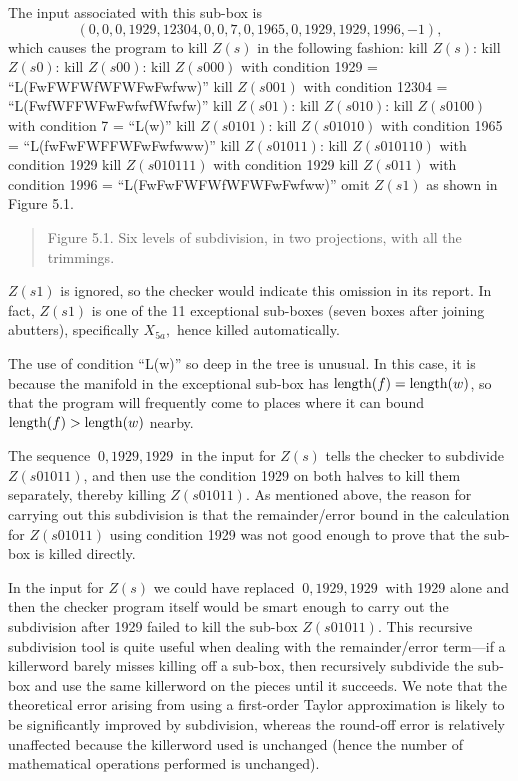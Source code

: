 The input associated with this sub-box is
$$(0, 0, 0, 1929, 12304, 0, 0, 7, 0, 1965, 0, 1929, 1929, 1996, -1),$$
which causes the program to kill $Z(s)$ in the following fashion:
{\noindent\obeylines
\def\>{\hskip 0.05in}
 kill $Z(s)$:
\>kill $Z(s0)$:
\>\>kill $Z(s00)$:
\>\>\>kill $Z(s000)$ with condition 1929 = ``L(FwFWFWfWFWFwFwfww)''
\>\>\>kill $Z(s001)$ with condition 12304 = ``L(FwfWFFWFwFwfwfWfwfw)''
\>\>kill $Z(s01)$:
\>\>\>kill $Z(s010)$:
\>\>\>\>kill $Z(s0100)$ with condition 7 = ``L(w)''
\>\>\>\>kill $Z(s0101)$:
\>\>\>\>\>kill $Z(s01010)$ with condition 1965 = ``L(fwFwFWFFWFwFwfwww)''
\>\>\>\>\>kill $Z(s01011)$:
\>\>\>\>\>\>kill $Z(s010110)$ with condition 1929
\>\>\>\>\>\>kill $Z(s010111)$ with condition 1929
\>\>\>kill $Z(s011)$ with condition 1996 = ``L(FwFwFWFWfWFWFwFwfww)''
\>omit $Z(s1)$
\noindent as shown in Figure 5.1.
}

 
 \centerline{}

 \begin{quote}{Figure 5.1.  Six levels of subdivision, in two projections,
 with all the trimmings.}
 \end{quote}

$Z(s1)$ is ignored, so the checker would indicate this omission
in its report.  In fact, $Z(s1)$ is one of the 11 exceptional sub-boxes (seven boxes after joining abutters), specifically
$X_{5a},$ hence killed automatically.

The use of condition ``L(w)'' so deep in the tree is unusual.
In this case, it is because the manifold in the exceptional sub-box
has ${\rm length}(f) = {\rm length}(w)$, so that the program will frequently
come to places where it can bound ${\rm length}(f) > {\rm length}(w)$ nearby.

The sequence $\ 0, 1929, 1929\ $ in the 
input for $Z(s)$ tells the checker to
subdivide $Z(s01011)$, and then use the condition 1929
on both halves to kill   them separately, 
thereby killing $Z(s01011)$.
As mentioned above,
the reason for carrying out this  subdivision 
is that the remainder/error bound in the calculation
 for $Z(s01011)$ using condition 1929 was not good enough
to prove that the sub-box is killed directly. 
 
 


In the input for $Z(s)$ we could have
replaced 
 $\ 0, 1929, 1929\ $ with 1929 alone
and then the checker
program itself would be smart enough to carry out
the subdivision after 1929 failed to kill the sub-box
$Z(s01011).$
This recursive subdivision tool is quite useful when dealing with the 
remainder/error term---if a killerword barely misses killing off a sub-box, then recursively subdivide the sub-box and
use the same killerword on the pieces until it succeeds.   We note that the theoretical error arising from using a
first-order Taylor approximation is likely to be significantly improved by subdivision, whereas the
round-off error is relatively unaffected because the killerword
used is unchanged (hence the number of mathematical operations
performed is unchanged).

